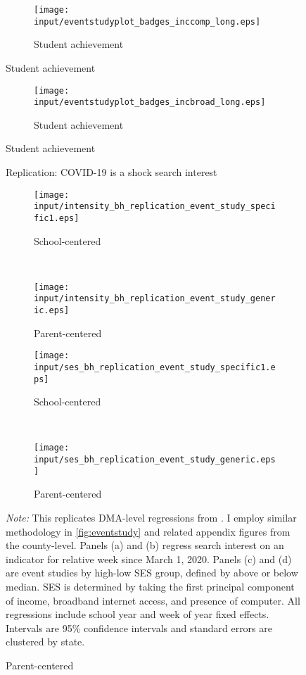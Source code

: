 \begin{figure}[hbt!]
    \centering
    \begin{subfigure}[t]{0.75\textwidth}
    \caption{Student achievement}
        \centering
        \texttt{[image: input/eventstudyplot\_badges\_inccomp\_long.eps]}
    \end{subfigure}%
\end{figure}

\begin{figure}[hbt!]
    \centering
    \begin{subfigure}[t]{0.75\textwidth}
    \caption{Student achievement}
        \centering
        \texttt{[image: input/eventstudyplot\_badges\_incbroad\_long.eps]}
    \end{subfigure}%
\end{figure}
\fi

\begin{figure}[hbt!]
    \caption{\cite{bh1} Replication: COVID-19 is a shock search interest}
    \centering
    \begin{subfigure}[t]{0.45\textwidth}
    \caption{School-centered}
        \centering
        \texttt{[image: input/intensity\_bh\_replication\_event\_study\_specific1.eps]}
    \end{subfigure}%
    ~
    \begin{subfigure}[t]{0.45\textwidth}
    \caption{Parent-centered}
        \centering
        \texttt{[image: input/intensity\_bh\_replication\_event\_study\_generic.eps]}
    \end{subfigure}
    \caption{This widened the high-low SES search interest gap}
      \centering
      \begin{subfigure}[t]{0.45\textwidth}
      \caption{School-centered}
          \centering
          \texttt{[image: input/ses\_bh\_replication\_event\_study\_specific1.eps]}
      \end{subfigure}%
      ~
      \begin{subfigure}[t]{0.45\textwidth}
      \caption{Parent-centered}
          \centering
          \texttt{[image: input/ses\_bh\_replication\_event\_study\_generic.eps]}
      \end{subfigure}
\begin{minipage}{\linewidth}
\footnotesize    \textit{Note:} This replicates DMA-level regressions from \cite{bh1}. I employ similar methodology in \ref{fig:eventstudy} and related appendix figures from the county-level. Panels (a) and (b) regress search interest on an indicator for relative week since March 1, 2020. Panels (c) and (d) are event studies by high-low SES group, defined by above or below median. SES is determined by taking the first principal component of income, broadband internet access, and presence of computer. All regressions include school year and week of year fixed effects. Intervals are 95\% confidence intervals and standard errors are clustered by state.
\end{minipage}
\end{figure}

